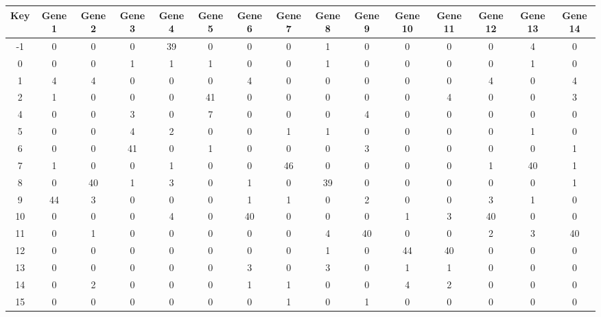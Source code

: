 \begin{tabular}{|c|c|c|c|c|c|c|c|c|c|c|c|c|c|c|}
\hline
Key & Gene 1 & Gene 2 & Gene 3 & Gene 4 & Gene 5 & Gene 6 & Gene 7 & Gene 8 & Gene 9 & Gene 10 & Gene 11 & Gene 12 & Gene 13 & Gene 14 \\
\hline
-1 & 0 & 0 & 0 & 39 & 0 & 0 & 0 & 1 & 0 & 0 & 0 & 0 & 4 & 0 \\
0 & 0 & 0 & 1 & 1 & 1 & 0 & 0 & 1 & 0 & 0 & 0 & 0 & 1 & 0 \\
1 & 4 & 4 & 0 & 0 & 0 & 4 & 0 & 0 & 0 & 0 & 0 & 4 & 0 & 4 \\
2 & 1 & 0 & 0 & 0 & 41 & 0 & 0 & 0 & 0 & 0 & 4 & 0 & 0 & 3 \\
4 & 0 & 0 & 3 & 0 & 7 & 0 & 0 & 0 & 4 & 0 & 0 & 0 & 0 & 0 \\
5 & 0 & 0 & 4 & 2 & 0 & 0 & 1 & 1 & 0 & 0 & 0 & 0 & 1 & 0 \\
6 & 0 & 0 & 41 & 0 & 1 & 0 & 0 & 0 & 3 & 0 & 0 & 0 & 0 & 1 \\
7 & 1 & 0 & 0 & 1 & 0 & 0 & 46 & 0 & 0 & 0 & 0 & 1 & 40 & 1 \\
8 & 0 & 40 & 1 & 3 & 0 & 1 & 0 & 39 & 0 & 0 & 0 & 0 & 0 & 1 \\
9 & 44 & 3 & 0 & 0 & 0 & 1 & 1 & 0 & 2 & 0 & 0 & 3 & 1 & 0 \\
10 & 0 & 0 & 0 & 4 & 0 & 40 & 0 & 0 & 0 & 1 & 3 & 40 & 0 & 0 \\
11 & 0 & 1 & 0 & 0 & 0 & 0 & 0 & 4 & 40 & 0 & 0 & 2 & 3 & 40 \\
12 & 0 & 0 & 0 & 0 & 0 & 0 & 0 & 1 & 0 & 44 & 40 & 0 & 0 & 0 \\
13 & 0 & 0 & 0 & 0 & 0 & 3 & 0 & 3 & 0 & 1 & 1 & 0 & 0 & 0 \\
14 & 0 & 2 & 0 & 0 & 0 & 1 & 1 & 0 & 0 & 4 & 2 & 0 & 0 & 0 \\
15 & 0 & 0 & 0 & 0 & 0 & 0 & 1 & 0 & 1 & 0 & 0 & 0 & 0 & 0 \\
\hline
\end{tabular}